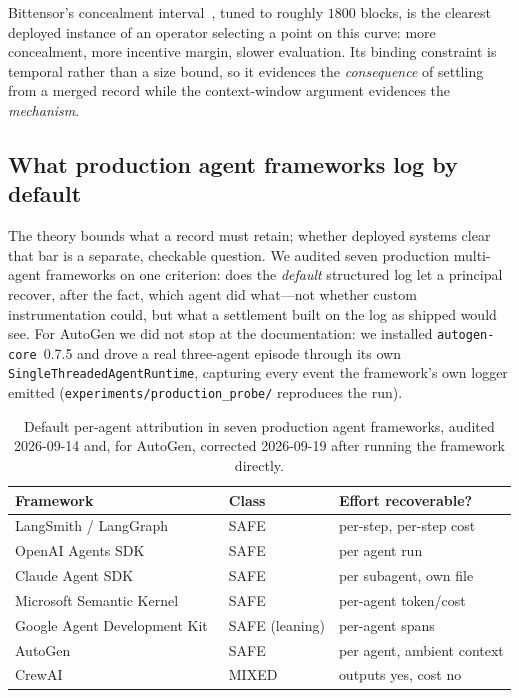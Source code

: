 Bittensor's concealment interval~\cite{bittensorcommitreveal}, tuned to roughly
$1800$ blocks, is the clearest deployed instance of an operator selecting a point
on this curve: more concealment, more incentive margin, slower evaluation. Its
binding constraint is temporal rather than a size bound, so it evidences the
\emph{consequence} of settling from a merged record while the context-window
argument evidences the \emph{mechanism}.

\subsection{What production agent frameworks log by default}
\label{sec:framework-audit}

The theory bounds what a record must retain; whether deployed systems clear that
bar is a separate, checkable question. We audited seven production multi-agent
frameworks on one criterion: does the \emph{default} structured log let a
principal recover, after the fact, which agent did what---not whether custom
instrumentation could, but what a settlement built on the log as shipped would
see. For AutoGen we did not stop at the documentation: we installed
\texttt{autogen-core}~0.7.5 and drove a real three-agent episode through its own
\texttt{SingleThreadedAgentRuntime}, capturing every event the framework's own
logger emitted (\texttt{experiments/production\_probe/} reproduces the run).

\begin{table}[t]
\centering
\caption{Default per-agent attribution in seven production agent frameworks,
audited 2026-09-14 and, for AutoGen, corrected 2026-09-19 after running the
framework directly.}
\label{tab:frameworks}
\small
\begin{tabular}{@{}lll@{}}
\toprule
Framework & Class & Effort recoverable? \\
\midrule
LangSmith / LangGraph~\cite{langsmithdocs} & SAFE & per-step, per-step cost \\
OpenAI Agents SDK~\cite{openaiagentssdk} & SAFE & per agent run \\
Claude Agent SDK & SAFE & per subagent, own file \\
Microsoft Semantic Kernel~\cite{semantickerneltokens} & SAFE & per-agent token/cost \\
Google Agent Development Kit~\cite{googleadktraces} & SAFE (leaning) & per-agent spans \\
AutoGen~\cite{autogenlogging} & SAFE & per agent, ambient context \\
CrewAI~\cite{crewaitracing,crewaiovercountissue} & MIXED & outputs yes, cost no \\
\bottomrule
\end{tabular}
\end{table}


